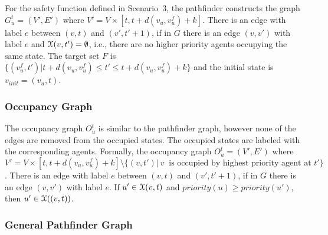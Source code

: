 \begin{eg}\label{eg:collavoid}
For the safety function defined in Scenario~3, the 
pathfinder constructs the graph $G^t_{u} = (V', E')$ where $V'=V\times[t,t+d(v_u,v_u^f)+k]$. There is an edge with label $e$ between $(v,t)$ and $(v',t' +1)$, if in $G$ there is an edge $(v,v')$ with label $e$ and $\mathcal{X}(v,t') = \emptyset$, i.e., there are no higher priority agents occupying the same state. 
The target set $F$ is $\{(v^f_{u} ,t') | t+ d(v_u,v_u^f) \leq t' \leq t + d(v_u,v_u^f) + k\}$ and the initial state is $v_{init} = (v_{u},t)$. %
\end{eg}

\subsubsection*{Occupancy Graph}
The occupancy graph $O^t_u$ is similar to the pathfinder graph, however none of the edges are removed from the occupied states. The occupied states are labeled with the corresponding agents. Formally, the occupancy graph $O^t_{u} = (V', E')$ where $V'=V\times[t,t+d(v_u,v_u^f)+k] \setminus \{(v,t')|~v~\text{ is occupied by highest priority agent at } t'\}$. There is an edge with label $e$ between $(v,t)$ and $(v',t' +1)$, if in $G$ there is an edge $(v,v')$ with label $e$. If $u' \in \mathcal{X}(v,t)$ and $priority(u) \geq priority(u')$, then $u' \in \mathcal{X}((v,t))$.  

\subsubsection*{General Pathfinder Graph}


